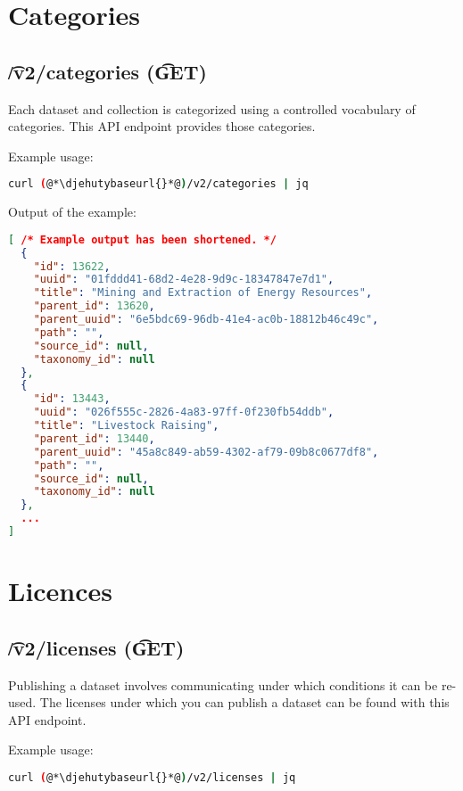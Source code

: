 \section{Categories}

\subsection{\t{/v2/categories} (\t{GET})}
\label{sec:v2-categories}

  Each dataset and collection is categorized using a controlled vocabulary
  of categories.  This API endpoint provides those categories.

  Example usage:
\begin{lstlisting}[language=bash]
curl (@*\djehutybaseurl{}*@)/v2/categories | jq
\end{lstlisting}

  Output of the example:
\begin{lstlisting}[language=JSON]
[ /* Example output has been shortened. */
  {
    "id": 13622,
    "uuid": "01fddd41-68d2-4e28-9d9c-18347847e7d1",
    "title": "Mining and Extraction of Energy Resources",
    "parent_id": 13620,
    "parent_uuid": "6e5bdc69-96db-41e4-ac0b-18812b46c49c",
    "path": "",
    "source_id": null,
    "taxonomy_id": null
  },
  {
    "id": 13443,
    "uuid": "026f555c-2826-4a83-97ff-0f230fb54ddb",
    "title": "Livestock Raising",
    "parent_id": 13440,
    "parent_uuid": "45a8c849-ab59-4302-af79-09b8c0677df8",
    "path": "",
    "source_id": null,
    "taxonomy_id": null
  },
  ...
]
\end{lstlisting}

\section{Licences}

\subsection{\t{/v2/licenses} (\t{GET})}
\label{sec:v2-licenses}

  Publishing a dataset involves communicating under which conditions it can be
  re-used.  The licenses under which you can publish a dataset can be found with
  this API endpoint.

  Example usage:
\begin{lstlisting}[language=bash]
curl (@*\djehutybaseurl{}*@)/v2/licenses | jq
\end{lstlisting}

